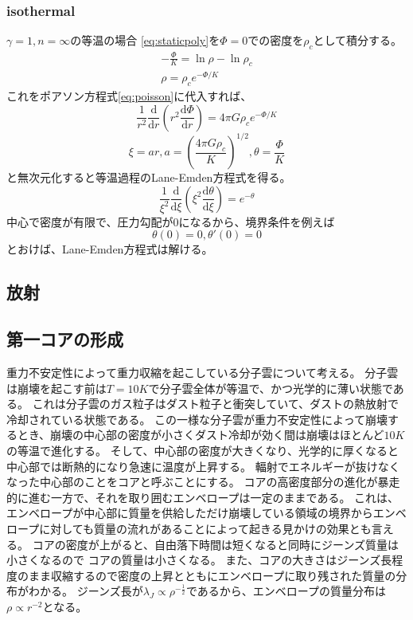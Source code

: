 \documentclass{jsarticle}
\newcommand{\dder}[2][]{\frac{\mathrm{d}#1}{\mathrm{d}#2}}
\newcommand{\half}{\frac{1}{2}}
\begin{document}
\subsubsection{isothermal}
$\gamma=1,n=\infty$の等温の場合
\eqref{eq:staticpoly}を$\Phi=0$での密度を$\rho_c$として積分する。
\begin{align}
    - \frac{\Phi}{K} = \ln \rho - \ln \rho_c\\
    \rho = \rho_ce^{-\Phi/K}
\end{align}
これをポアソン方程式\eqref{eq:poisson}に代入すれば、
\begin{equation}
    \frac{1}{r^2}\dder[]{r}(r^2\dder[\Phi]{r}) = 4\pi G\rho_c e^{-\Phi/K}
\end{equation}
\begin{equation}
    \xi = ar, a = \left( \frac{4\pi G \rho_c}{K}\right)^{1/2}, \theta = \frac{\Phi}{K}
\end{equation}
と無次元化すると等温過程のLane-Emden方程式を得る。
\begin{equation}
    \frac{1}{\xi^2}\dder[]{\xi}\left(\xi^2\dder[\theta]{\xi}\right) = e^{-\theta}
\end{equation}
中心で密度が有限で、圧力勾配が$0$になるから、境界条件を例えば
\begin{equation}
    \theta(0) = 0,    \theta'(0) = 0
\end{equation}
とおけば、Lane-Emden方程式は解ける。
\subsection{放射}
\subsection{第一コアの形成}
重力不安定性によって重力収縮を起こしている分子雲について考える。
分子雲は崩壊を起こす前は$T=10K$で分子雲全体が等温で、かつ光学的に薄い状態である。
これは分子雲のガス粒子はダスト粒子と衝突していて、ダストの熱放射で冷却されている状態である。
この一様な分子雲が重力不安定性によって崩壊するとき、崩壊の中心部の密度が小さくダスト冷却が効く間は崩壊はほとんど$10K$の等温で進化する。
そして、中心部の密度が大きくなり、光学的に厚くなると中心部では断熱的になり急速に温度が上昇する。
輻射でエネルギーが抜けなくなった中心部のことをコアと呼ぶことにする。
コアの高密度部分の進化が暴走的に進む一方で、それを取り囲むエンベロープは一定のままである。
これは、エンベロープが中心部に質量を供給しただけ崩壊している領域の境界からエンベロープに対しても質量の流れがあることによって起きる見かけの効果とも言える。
コアの密度が上がると、自由落下時間は短くなると同時にジーンズ質量は小さくなるので
コアの質量は小さくなる。
また、コアの大きさはジーンズ長程度のまま収縮するので密度の上昇とともにエンベロープに取り残された質量の分布がわかる。
ジーンズ長が$\lambda_J \propto \rho^{-\half}$であるから、エンベロープの質量分布は
$\rho \propto r^{-2}$となる。
\end{document}

